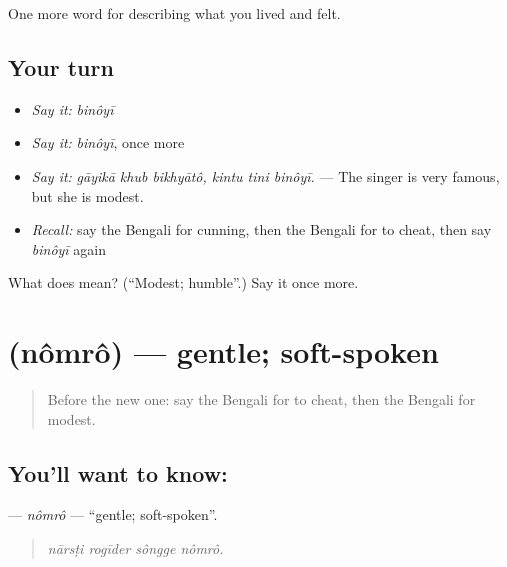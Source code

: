 \begin{grammarlens}[title={What you've built}]
One more word for describing what you lived and felt.
\end{grammarlens}

\subsection*{Your turn}
\begin{itemize}
\raggedright
  \item \emph{Say it:} \emph{binôyī}
  \item \emph{Say it:} \emph{binôyī}, once more
  \item \emph{Say it:} \emph{gāyikā khub bikhyātô, kintu tini binôyī.} — The singer is very famous, but she is modest.
  \item \emph{Recall:} say the Bengali for cunning, then the Bengali for to cheat, then say \emph{binôyī} again
\end{itemize}

\begin{tcolorbox}[breakable,colback=teal!4,colframe=teal!35!black,title={Before you move on}]
What does  mean? (\textquotedblleft{}Modest; humble\textquotedblright{}.) Say it once more.
\end{tcolorbox}
\section[\texorpdfstring{\bn{নম্র} (nômrô)}{নম্র (nômrô)}]{ (nômrô) — gentle; soft-spoken}

\label{lesson:BN-C459-nomro}



\begin{quote}
Before the new one: say the Bengali for to cheat, then the Bengali for modest.
\end{quote}

\subsection*{You'll want to know: }
\textbf{} — \emph{nômrô} — \textquotedblleft{}gentle; soft-spoken\textquotedblright{}.

\begin{quote}
   
\end{quote}

\begin{quote}
\emph{nārsṭi rogīder sôngge nômrô.}
\end{quote}


